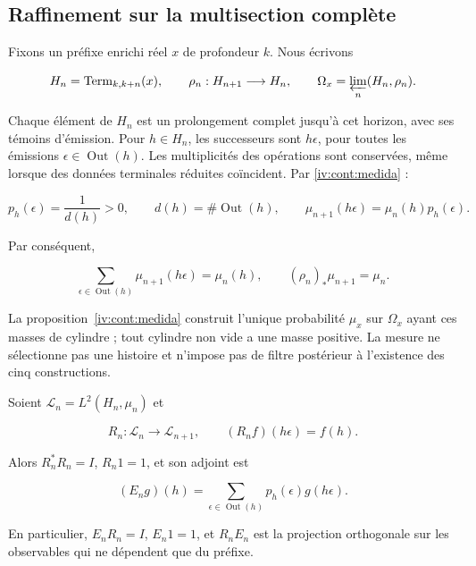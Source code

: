 \subsection{Raffinement sur la multisection complète
}

Fixons un préfixe enrichi réel \(x\) de profondeur \(k\). Nous écrivons


\[
H_n=\operatorname{Term}_{k,k+n}(x),\qquad
\rho_n:H_{n+1}\longrightarrow H_n,
\qquad \Omega_x=\varprojlim_n(H_n,\rho_n).
\]

Chaque élément de \(H_n\) est un prolongement complet jusqu’à cet horizon, avec ses témoins d’émission. Pour \(h\in H_n\), les successeurs sont \(h\epsilon\), pour toutes les émissions \(\epsilon\in\operatorname{Out}(h)\). Les multiplicités des opérations sont conservées, même lorsque des données terminales réduites coïncident. Par \cref{iv:cont:medida} :

\[
p_h(\epsilon)=\frac1{d(h)}>0,\qquad
d(h)=\#\operatorname{Out}(h),\qquad
\mu_{n+1}(h\epsilon)=\mu_n(h)p_h(\epsilon).
\]

Par conséquent,

\begin{equation}
\sum_{\epsilon\in\operatorname{Out}(h)}\mu_{n+1}(h\epsilon)=\mu_n(h),
\qquad (\rho_n)_*\mu_{n+1}=\mu_n.
\label{nuc01:eq:1}
\end{equation}

La proposition~\ref{iv:cont:medida} construit l’unique probabilité \(\mu_x\) sur \(\Omega_x\) ayant ces masses de cylindre ; tout cylindre non vide a une masse positive. La mesure ne sélectionne pas une histoire et n’impose pas de filtre postérieur à l’existence des cinq constructions.

\begin{proposition}
\label{nuc01:pullback}

Soient \(\mathscr L_n=L^2(H_n,\mu_n)\) et

\[
R_n:\mathscr L_n\longrightarrow\mathscr L_{n+1},\qquad
(R_nf)(h\epsilon)=f(h).
\]

Alors \(R_n^*R_n=I\), \(R_n1=1\), et son adjoint est

\begin{equation}
(E_ng)(h)=\sum_{\epsilon\in\operatorname{Out}(h)}p_h(\epsilon)g(h\epsilon).
\label{nuc01:eq:2}
\end{equation}

En particulier, \(E_nR_n=I\), \(E_n1=1\), et \(R_nE_n\) est la projection orthogonale sur les observables qui ne dépendent que du préfixe.
\end{proposition}

